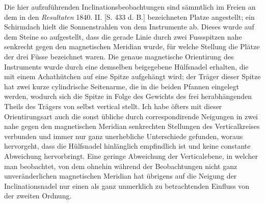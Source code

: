 Die hier aufzuführenden Inclinationsbeobachtungen sind sämmtlich im Freien an dem in den \textit{Resultaten} 1840. II. [S. 433 d. B.] bezeichneten Platze angestellt; ein Schirmdach hielt die Sonnenstrahlen von dem Instrumente ab. Dieses wurde auf dem Steine so aufgestellt, dass die gerade Linie durch zwei Fussspitzen nahe senkrecht gegen den magnetischen Meridian wurde, für welche Stellung die Plätze der drei Füsse bezeichnet waren. Die genaue magnetische Orientirung des Instruments wurde durch eine demselben beigegebene Hülfsnadel erhalten, die mit einem Achathütchen auf eine Spitze aufgehängt wird; der Träger dieser Spitze hat zwei kurze cylindrische Seitenarme, die in die beiden Pfannen eingelegt werden, wodurch sich die Spitze in Folge des Gewichts des frei herabhängenden Theils des Trägers von selbst vertical stellt. Ich habe öfters mit dieser Orientirungsart auch die sonst übliche durch correspondirende Neigungen in zwei nahe gegen den magnetischen Meridian senkrechten Stellungen des Verticalkreises verbunden und immer nur ganz unerhebliche Unterschiede gefunden, woraus hervorgeht, dass die Hülfsnadel hinlänglich empfindlich ist und keine constante Abweichung hervorbringt. Eine geringe Abweichung der Verticalebene, in welcher man beobachtet, von dem ohnehin während der Beobachtungen nicht ganz unveränderlichen magnetischen Meridian hat übrigens auf die Neigung der Inclinationsnadel nur einen als ganz unmerklich zu betrachtenden Einfluss von der zweiten Ordnung.

